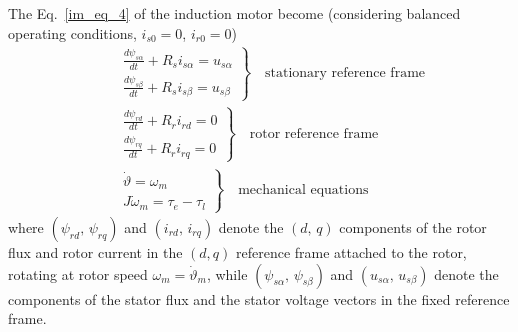 \documentclass[11pt,a4paper,oneside]{book}
\numberwithin{equation}{section}
\theoremstyle{it}
\theoremstyle{definition}
\begin{document}
The Eq.~\eqref{im_eq_4} of the induction motor become (considering balanced 
operating conditions, $i_{s0}=0$, $i_{r0}=0$)
\begin{equation}\label{im_eq_11}
	\begin{aligned}
		&\left. \begin{aligned}
			& \frac{d\psi_{s\alpha}}{dt} + R_s i_{s\alpha} = u_{s\alpha} \\[6pt]
			& \frac{d\psi_{s\beta}}{dt} + R_s i_{s\beta} = u_{s\beta} 
		\end{aligned}\right\rbrace \quad\text{stationary reference frame}\\[6pt]
		&\left. \begin{aligned}
			& \frac{d\psi_{rd}}{dt} + R_r i_{rd} = 0 \\[6pt]
			& \frac{d\psi_{rq}}{dt} + R_r i_{rq} = 0 
		\end{aligned}\right\rbrace \quad\text{rotor reference frame}\\[6pt]
		&\left. \begin{aligned}
			& \dot{\vartheta} = \omega_m \\[6pt]
			& J\dot{\omega}_m = \tau_e -\tau_l
		\end{aligned}\right\rbrace \quad\text{mechanical equations}
	\end{aligned}
\end{equation}
where $(\psi_{rd},\, \psi_{rq})$ and  $(i_{rd},\, i_{rq})$ denote the $(d,\,q)$ 
components of the rotor flux and rotor current in the $(d,q)$ reference frame 
attached to the rotor, rotating at rotor speed $\omega_m = \dot{\vartheta}_m$, 
while $(\psi_{s\alpha},\, \psi_{s\beta})$ and  $(u_{s\alpha},\, u_{s\beta})$ 
denote the components of the stator flux and the stator voltage vectors in the 
fixed reference frame.
\end{document}
